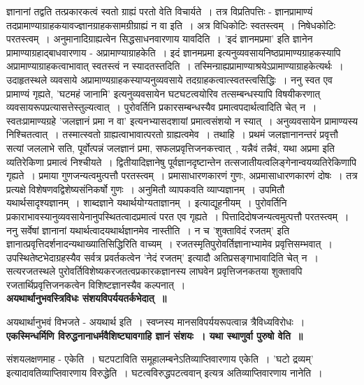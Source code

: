 	ज्ञानानां तद्वति तत्प्रकारकत्वं स्वतो ग्राह्यं परतो वेति विचार्यते~। तत्र विप्रतिपत्तिः - ज्ञानप्रामाण्यं तदप्रामाण्याग्राहकयावज्ज्ञानग्राहकसामग्रीग्राह्यं न वा इति~। अत्र विधिकोटिः स्वतस्त्वम्~। निषेधकोटिः परतस्त्वम्~। अनुमानादिग्राह्यत्वेन सिद्धसाधनवारणाय यावदिति~। ’इदं ज्ञानमप्रमा’ इति ज्ञानेन प्रामाण्याग्रहाद्बाधवारणाय - अप्रामाण्याग्राहकेति~। इदं ज्ञानमप्रमा इत्यनुव्यवसायनिष्ठप्रामाण्यग्राहकस्यापि अप्रामाण्याग्राहकत्वाभावात् स्वतस्त्वं न स्यादतस्तदिति~। तस्मिन्ग्राह्यप्रामाण्याश्रयेऽप्रामाण्याग्राहकेत्यर्थः~। उदाहृतस्थले व्यवसाये अप्रामाण्यग्राहकस्याप्यनुव्यवसाये तदग्राहकत्वात्स्वतस्त्वसिद्धिः~। ननु स्वत एव प्रामाण्यं गृह्यते, ’घटमहं जानामि’ इत्यनुव्यवसायेन घटघटत्वयोरिव तत्सम्बन्धस्यापि विषयीकरणात् व्यवसायरूपप्रत्यासत्तेस्तुल्यत्वात्~। पुरोवर्तिनि प्रकारसम्बन्धस्यैव प्रमात्वपदार्थत्वादिति चेत् न~। स्वतःप्रामाण्यग्रहे ’जलज्ञानं प्रमा न वा’ इत्यनभ्यासदशायां प्रमात्वसंशयो न स्यात्~। अनुव्यवसायेन प्रामाण्यस्य निश्चितत्वात्~। तस्मात्स्वतो ग्राह्यत्वाभावात्परतो ग्राह्यत्वमेव~। तथाहि~। प्रथमं जलज्ञानानन्तरं प्रवृत्तौ सत्यां जललाभे सति, पूर्वोत्पन्नं जलज्ञानं प्रमा, सफलप्रवृत्तिजनकत्त्वात्~, यन्नैवं तन्नैवं, यथा अप्रमा इति व्यतिरेकिणा प्रमात्वं निश्चीयते~। द्वितीयादिज्ञानेषु पूर्वज्ञानदृष्टान्तेन तत्सजातीयत्वलिङ्गेनान्वयव्यतिरेकिणापि गृह्यते~। प्रमाया गुणजन्यत्वमुत्पत्तौ परतस्त्वम्~। प्रमासाधारणकारणं गुणः, अप्रमासाधारणकारणं दोषः~। तत्र प्रत्यक्षे विशेषणवद्विशेष्यसंनिकर्षो गुणः~। अनुमितौ व्यापकवति व्याप्यज्ञानम्~। उपमितौ यथार्थसादृश्यज्ञानम्~। शाब्दज्ञाने यथार्थयोग्यताज्ञानम्~। इत्याद्यूहनीयम्~। पुरोवर्तिनि प्रकाराभावस्यानुव्यवसायेनानुपस्थितत्वादप्रमात्वं परत एव गृह्यते~। पित्तादिदोषजन्यत्वमुत्पत्तौ परतस्त्वम्~। ननु सर्वेषां ज्ञानानां यथार्थत्वादयथार्थज्ञानमेव नास्तीति~। न च ’शुक्ताविदं रजतम्’ इति ज्ञानात्प्रवृत्तिदर्शनादन्यथाख्यातिसिद्धिरिति वाच्यम्~। रजतस्मृतिपुरोवर्तिज्ञानाभ्यामेव प्रवृत्तिसम्भवात्~। उपस्थितेष्टभेदाग्रहस्यैव सर्वत्र प्रवर्तकत्वेन ’नेदं रजतम्’ इत्यादौ अतिप्रसङ्गाभावादिति चेत् न~। सत्यरजतस्थले पुरोवर्तिविशेष्यकरजतत्वप्रकारकज्ञानस्य लाघवेन प्रवृत्तिजनकतया शुक्तावपि रजतार्थिप्रवृत्तिजनकत्वेन विशिष्टज्ञानस्यैव कल्पनात्~।\\[10pt]
{\bfseries अयथार्थानुभवस्त्रिविधः संशयविपर्ययतर्कभेदात्~॥}\par
	अयथार्थानुभवं विभजते - अयथार्थ इति~। स्वप्नस्य मानसविपर्ययरूपत्वान्न त्रैविध्यविरोधः~।\\[10pt]
{\bfseries एकस्मिन्धर्मिणि विरुद्धनानाधर्मवैशिष्ट्यावगाहि ज्ञानं संशयः~। यथा स्थाणुर्वा पुरुषो वेति~॥}\par
	संशयलक्षणमाह - एकेति~। घटपटाविति समूहालम्बनेऽतिव्याप्तिवारणाय एकेति~। ’घटो द्रव्यम्’ इत्यादावतिव्याप्तिवारणाय विरुद्धेति~। घटत्वविरुद्धपटत्ववान् इत्यत्र अतिव्याप्तिवारणाय नानेति~।\\[10pt]
